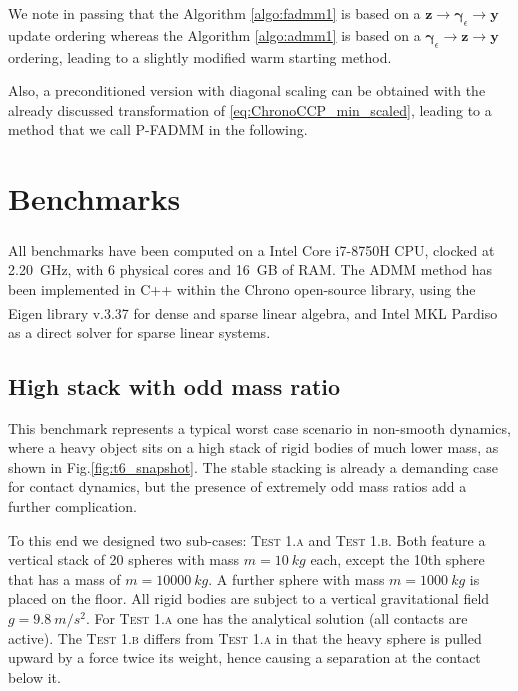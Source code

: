 \documentclass[final,3p]{elsarticle}
\newcommand{\vect}[1]{\bm{#1}}
\begin{document}
We note in passing that the Algorithm \ref{algo:fadmm1} is based on a 
$\vect{z} \rightarrow \vect{\gamma}_\epsilon \rightarrow \vect{y}$ 
update ordering whereas the Algorithm \ref{algo:admm1} is based on a 
$\vect{\gamma}_\epsilon \rightarrow  \vect{z} \rightarrow  \vect{y}$ ordering, leading
to a slightly modified warm starting method.

Also, a preconditioned version with diagonal scaling can be obtained with the already discussed transformation of \eqref{eq:ChronoCCP_min_scaled}, leading to a method that we call P-FADMM in the following.



\section{Benchmarks}

All benchmarks have been computed on a Intel\textsuperscript{\textregistered} Core\textsuperscript{\texttrademark} i7-8750H CPU, clocked at \SI{2.20}{GHz}, with 6 physical cores and \SI{16}{GB} of RAM. 
The ADMM method has been implemented
in C++ within the Chrono open-source library, using the Eigen library v.3.37 for dense and sparse linear algebra, and Intel\textsuperscript{\textregistered} MKL Pardiso as a direct solver for sparse linear systems.

\subsection{High stack with odd mass ratio}

This benchmark represents a typical worst case scenario in non-smooth dynamics, where
a heavy object sits on a high stack of rigid bodies of much lower mass, as shown in Fig.\ref{fig:t6_snapshot}. The stable stacking
is already a demanding case for contact dynamics, but the presence of extremely odd mass ratios add a
further complication. 

To this end we designed two sub-cases: \textsc{Test 1.a} and \textsc{Test 1.b}. Both feature
a vertical stack of 20 spheres with mass $m=\SI{10}{kg}$ each, except the 10th sphere that has
a mass of $m=\SI{10000}{kg}$. A further sphere with mass $m=\SI{1000}{kg}$ is placed on the floor.
All rigid bodies are subject to a vertical gravitational field $g=\SI{9.8}{m/s^2}$. For \textsc{Test 1.a}
one has the analytical solution (all contacts are active). The \textsc{Test 1.b}
differs from \textsc{Test 1.a} in that the heavy sphere is pulled upward by a force twice its weight, hence
causing a separation at the contact below it.
\end{document}

